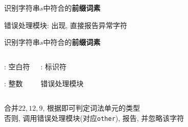 \begin{frame}{}
  \begin{center}
    识别字符串$s$中符合的{\bf 前缀词素}

    \vspace{0.60cm}

    \vspace{0.50cm}
    错误处理模块: 出现, 直接报告异常字符
  \end{center}
\end{frame}

\begin{frame}{}
  \begin{center}
    识别字符串$s$中符合的{\bf 前缀词素}
  \end{center}

  \begin{columns}
      \begin{center}
        \ws: 空白符

        \vspace{0.20cm}
        \intnum: 整数
      \end{center}
      \begin{center}
        \id: 标识符

        \vspace{0.40cm}
        错误处理模块
      \end{center}
  \end{columns}

  \pause
  \vspace{0.30cm}
  \begin{center}
     合并$22, 12, 9$, 根据即可判定词法单元的类型 \\[8pt]
    否则, 调用错误处理模块(对应\texttt{other}), 报告, 并忽略该字符
  \end{center}
\end{frame}

\begin{frame}{}
\end{frame}

